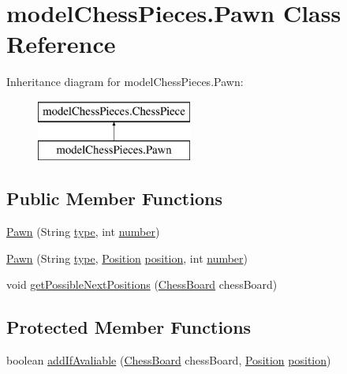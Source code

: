 \hypertarget{classmodel_chess_pieces_1_1_pawn}{\section{model\+Chess\+Pieces.\+Pawn Class Reference}
\label{classmodel_chess_pieces_1_1_pawn}
}
Inheritance diagram for model\+Chess\+Pieces.\+Pawn\+:\begin{figure}[H]
\begin{center}
\leavevmode
\includegraphics[height=2.000000cm]{classmodel_chess_pieces_1_1_pawn}
\end{center}
\end{figure}
\subsection*{Public Member Functions}
\begin{DoxyCompactItemize}
\item 
\hyperlink{classmodel_chess_pieces_1_1_pawn_a7621de9604258a4ec1c58480b1655564}{Pawn} (String \hyperlink{classmodel_chess_pieces_1_1_chess_piece_a195487ca88c197af7c1604247be31db2}{type}, int \hyperlink{classmodel_chess_pieces_1_1_chess_piece_a979e63b99128333883acedc38d25dc87}{number})
\item 
\hyperlink{classmodel_chess_pieces_1_1_pawn_afcf3ca5e22f454c225ca2240af0f4519}{Pawn} (String \hyperlink{classmodel_chess_pieces_1_1_chess_piece_a195487ca88c197af7c1604247be31db2}{type}, \hyperlink{classmodel_core_1_1_position}{Position} \hyperlink{classmodel_chess_pieces_1_1_chess_piece_a3d4362d5b28f6edb14161196d9c6807d}{position}, int \hyperlink{classmodel_chess_pieces_1_1_chess_piece_a979e63b99128333883acedc38d25dc87}{number})
\item 
void \hyperlink{classmodel_chess_pieces_1_1_pawn_a5d8959f38fa543fc471ca95b025cea91}{get\+Possible\+Next\+Positions} (\hyperlink{classmodel_core_1_1_chess_board}{Chess\+Board} chess\+Board)
\end{DoxyCompactItemize}
\subsection*{Protected Member Functions}
\begin{DoxyCompactItemize}
\item 
boolean \hyperlink{classmodel_chess_pieces_1_1_pawn_adf484645070f9dd3a774ea779aa84260}{add\+If\+Avaliable} (\hyperlink{classmodel_core_1_1_chess_board}{Chess\+Board} chess\+Board, \hyperlink{classmodel_core_1_1_position}{Position} \hyperlink{classmodel_chess_pieces_1_1_chess_piece_a3d4362d5b28f6edb14161196d9c6807d}{position})
\end{DoxyCompactItemize}
